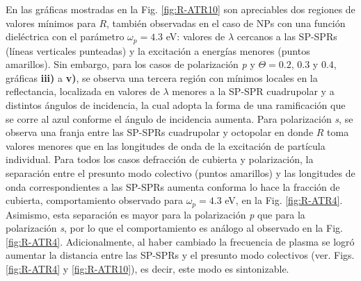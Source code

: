 En las gráficas mostradas en la Fig. \ref{fig:R-ATR10} son apreciables dos regiones de valores mínimos para $R$, también observadas en el caso de NPs con una función dieléctrica con el parámetro $\omega_p=4.3$ eV: valores de $\lambda$ cercanos a las SP-SPRs (líneas verticales punteadas) y la excitación a energías menores (puntos amarillos). Sin embargo, para los casos de polarización \emph{p} y $\Theta = 0.2,\,0.3$ y $0.4$, gráficas \textbf{iii)} a \textbf{v)}, se observa una tercera región con mínimos locales en la reflectancia, localizada en valores de $\lambda$ menores a la SP-SPR cuadrupolar y a distintos ángulos de incidencia, la cual adopta la forma de una ramificación que se corre al azul conforme el ángulo de incidencia aumenta. Para polarización \emph{s}, se observa una franja entre las SP-SPRs cuadrupolar y octopolar en donde $R$ toma valores menores que en las longitudes de onda de la excitación de partícula individual. Para todos los casos defracción de cubierta y polarización, la separación  entre el presunto modo colectivo (puntos amarillos) y las longitudes de onda correspondientes a las SP-SPRs aumenta conforma lo hace la fracción de cubierta, comportamiento observado para $\omega_p = 4.3$ eV, en la Fig.  \ref{fig:R-ATR4}.  Asimismo, esta separación es mayor para la polarización \emph{p} que para la polarización \emph{s}, por lo que el comportamiento es análogo al observado en la Fig. \ref{fig:R-ATR4}. Adicionalmente, al haber cambiado la frecuencia de plasma se logró aumentar la distancia entre las SP-SPRs y el presunto modo colectivos (ver. Figs. \ref{fig:R-ATR4} y \ref{fig:R-ATR10}), es decir, este modo es sintonizable.

